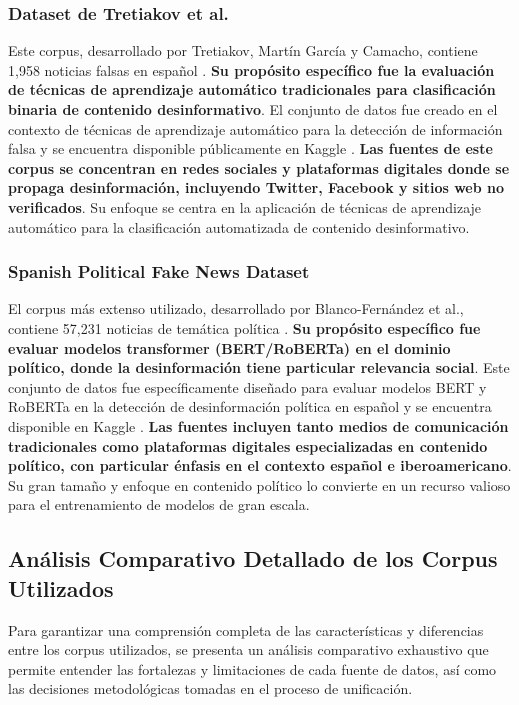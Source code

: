 \subsubsection{Dataset de Tretiakov et al.}

Este corpus, desarrollado por Tretiakov, Martín García y Camacho, contiene 1,958 noticias falsas en español \cite{tretiakov2022detection}. \textbf{Su propósito específico fue la evaluación de técnicas de aprendizaje automático tradicionales para clasificación binaria de contenido desinformativo}. El conjunto de datos fue creado en el contexto de técnicas de aprendizaje automático para la detección de información falsa y se encuentra disponible públicamente en Kaggle \cite{tretiakov2022noticias}. \textbf{Las fuentes de este corpus se concentran en redes sociales y plataformas digitales donde se propaga desinformación, incluyendo Twitter, Facebook y sitios web no verificados}. Su enfoque se centra en la aplicación de técnicas de aprendizaje automático para la clasificación automatizada de contenido desinformativo.

\subsubsection{Spanish Political Fake News Dataset}

El corpus más extenso utilizado, desarrollado por Blanco-Fernández et al., contiene 57,231 noticias de temática política \cite{blanco2024enhancing}. \textbf{Su propósito específico fue evaluar modelos transformer (BERT/RoBERTa) en el dominio político, donde la desinformación tiene particular relevancia social}. Este conjunto de datos fue específicamente diseñado para evaluar modelos BERT y RoBERTa en la detección de desinformación política en español y se encuentra disponible en Kaggle \cite{blanco2024spanish}. \textbf{Las fuentes incluyen tanto medios de comunicación tradicionales como plataformas digitales especializadas en contenido político, con particular énfasis en el contexto español e iberoamericano}. Su gran tamaño y enfoque en contenido político lo convierte en un recurso valioso para el entrenamiento de modelos de gran escala.

\subsection{Análisis Comparativo Detallado de los Corpus Utilizados}

Para garantizar una comprensión completa de las características y diferencias entre los corpus utilizados, se presenta un análisis comparativo exhaustivo que permite entender las fortalezas y limitaciones de cada fuente de datos, así como las decisiones metodológicas tomadas en el proceso de unificación.

